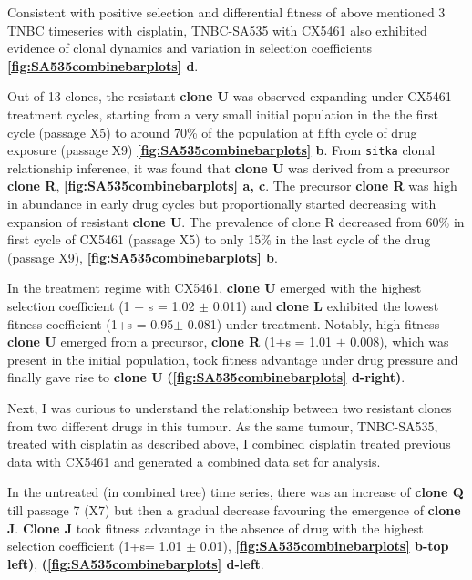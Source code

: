 Consistent with positive selection and differential fitness of above mentioned 3 TNBC timeseries with cisplatin, TNBC-SA535 with CX5461 also exhibited evidence of clonal dynamics and variation in selection coefficients \textbf{\autoref{fig:SA535combinebarplots} d}. 

Out of 13 clones, the resistant \textbf{clone U} was observed expanding under CX5461 treatment cycles, starting from a very small initial population in the the first cycle (passage X5) to around 70\% of the population at fifth cycle of drug exposure (passage X9) \textbf{\autoref{fig:SA535combinebarplots} b}. From \texttt{sitka} clonal relationship inference, it was found that \textbf{clone U} was derived from a precursor \textbf{clone R},  \textbf{\autoref{fig:SA535combinebarplots} a, c}. The precursor \textbf{clone R} was high in abundance in early drug cycles but proportionally started decreasing with expansion of resistant \textbf{clone U}. The prevalence of clone R decreased from 60\% in first cycle of CX5461 (passage X5) to only 15\% in the last cycle of the drug (passage X9), \textbf{\autoref{fig:SA535combinebarplots} b}. 


In the treatment regime with CX5461, \textbf{clone U} emerged with the highest selection coefficient (1 + s = 1.02 $\pm$ 0.011) and \textbf{clone L} exhibited the lowest fitness coefficient (1+s = 0.95$\pm$ 0.081) under treatment. Notably, high fitness \textbf{clone U} emerged from a precursor, \textbf{clone R} (1+s = 1.01 $\pm$ 0.008), which was present in the initial population, took fitness advantage under drug pressure and finally gave rise to \textbf{clone U} \textbf{(\autoref{fig:SA535combinebarplots} d-right)}. 

Next, I was curious to understand the relationship between two resistant clones from two different drugs in this tumour. As the same tumour, TNBC-SA535, treated with cisplatin as described above, I combined cisplatin treated previous data with CX5461 and generated a combined data set for analysis. 


In the untreated (in combined tree) time series, there was an increase of \textbf{clone Q} till passage 7 (X7) but then a gradual decrease favouring the emergence of \textbf{clone J}. \textbf{Clone J} took fitness advantage in the absence of drug with the highest selection coefficient (1+s= 1.01 $\pm$ 0.01),   \textbf{\autoref{fig:SA535combinebarplots} b-top left)}, \textbf{(\autoref{fig:SA535combinebarplots} d-left}. 

